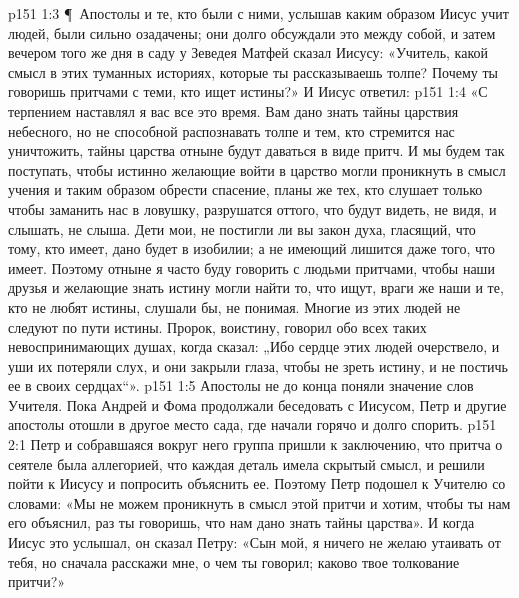 \vs p151 1:3 \P\ Апостолы и те, кто были с ними, услышав каким образом Иисус учит людей, были сильно озадачены; они долго обсуждали это между собой, и затем вечером того же дня в саду у Зеведея Матфей сказал Иисусу: «Учитель, какой смысл в этих туманных историях, которые ты рассказываешь толпе? Почему ты говоришь притчами с теми, кто ищет истины?» И Иисус ответил:
\vs p151 1:4 «С терпением наставлял я вас все это время. Вам дано знать тайны царствия небесного, но не способной распознавать толпе и тем, кто стремится нас уничтожить, тайны царства отныне будут даваться в виде притч. И мы будем так поступать, чтобы истинно желающие войти в царство могли проникнуть в смысл учения и таким образом обрести спасение, планы же тех, кто слушает только чтобы заманить нас в ловушку, разрушатся оттого, что будут видеть, не видя, и слышать, не слыша. Дети мои, не постигли ли вы закон духа, гласящий, что тому, кто имеет, дано будет в изобилии; а не имеющий лишится даже того, что имеет. Поэтому отныне я часто буду говорить с людьми притчами, чтобы наши друзья и желающие знать истину могли найти то, что ищут, враги же наши и те, кто не любят истины, слушали бы, не понимая. Многие из этих людей не следуют по пути истины. Пророк, воистину, говорил обо всех таких невоспринимающих душах, когда сказал: „Ибо сердце этих людей очерствело, и уши их потеряли слух, и они закрыли глаза, чтобы не зреть истину, и не постичь ее в своих сердцах“».
\vs p151 1:5 Апостолы не до конца поняли значение слов Учителя. Пока Андрей и Фома продолжали беседовать с Иисусом, Петр и другие апостолы отошли в другое место сада, где начали горячо и долго спорить.
\vs p151 2:1 Петр и собравшаяся вокруг него группа пришли к заключению, что притча о сеятеле была аллегорией, что каждая деталь имела скрытый смысл, и решили пойти к Иисусу и попросить объяснить ее. Поэтому Петр подошел к Учителю со словами: «Мы не можем проникнуть в смысл этой притчи и хотим, чтобы ты нам его объяснил, раз ты говоришь, что нам дано знать тайны царства». И когда Иисус это услышал, он сказал Петру: «Сын мой, я ничего не желаю утаивать от тебя, но сначала расскажи мне, о чем ты говорил; каково твое толкование притчи?»

